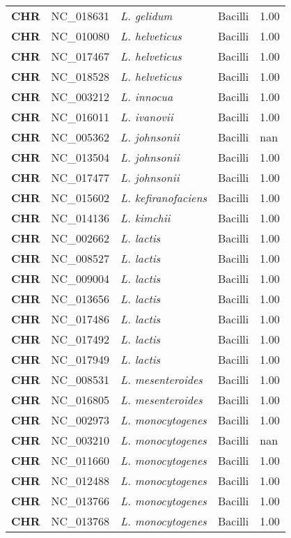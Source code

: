 \begin{adjustwidth}{-3cm}{2cm}
{\begin{supertabular}{>{\bfseries}l|p{0.1\textwidth}p{0.14\textwidth}l|l}
CHR & NC\_018631 & \textit{L. gelidum} & Bacilli & 1.00\\
CHR & NC\_010080 & \textit{L. helveticus} & Bacilli & 1.00\\
CHR & NC\_017467 & \textit{L. helveticus} & Bacilli & 1.00\\
CHR & NC\_018528 & \textit{L. helveticus} & Bacilli & 1.00\\
CHR & NC\_003212 & \textit{L. innocua} & Bacilli & 1.00\\
CHR & NC\_016011 & \textit{L. ivanovii} & Bacilli & 1.00\\
CHR & NC\_005362 & \textit{L. johnsonii} & Bacilli & nan\\
CHR & NC\_013504 & \textit{L. johnsonii} & Bacilli & 1.00\\
CHR & NC\_017477 & \textit{L. johnsonii} & Bacilli & 1.00\\
CHR & NC\_015602 & \textit{L. kefiranofaciens} & Bacilli & 1.00\\
CHR & NC\_014136 & \textit{L. kimchii} & Bacilli & 1.00\\
CHR & NC\_002662 & \textit{L. lactis} & Bacilli & 1.00\\
CHR & NC\_008527 & \textit{L. lactis} & Bacilli & 1.00\\
CHR & NC\_009004 & \textit{L. lactis} & Bacilli & 1.00\\
CHR & NC\_013656 & \textit{L. lactis} & Bacilli & 1.00\\
CHR & NC\_017486 & \textit{L. lactis} & Bacilli & 1.00\\
CHR & NC\_017492 & \textit{L. lactis} & Bacilli & 1.00\\
CHR & NC\_017949 & \textit{L. lactis} & Bacilli & 1.00\\
CHR & NC\_008531 & \textit{L. mesenteroides} & Bacilli & 1.00\\
CHR & NC\_016805 & \textit{L. mesenteroides} & Bacilli & 1.00\\
CHR & NC\_002973 & \textit{L. monocytogenes} & Bacilli & 1.00\\
CHR & NC\_003210 & \textit{L. monocytogenes} & Bacilli & nan\\
CHR & NC\_011660 & \textit{L. monocytogenes} & Bacilli & 1.00\\
CHR & NC\_012488 & \textit{L. monocytogenes} & Bacilli & 1.00\\
CHR & NC\_013766 & \textit{L. monocytogenes} & Bacilli & 1.00\\
CHR & NC\_013768 & \textit{L. monocytogenes} & Bacilli & 1.00\\

\end{supertabular}}
\end{adjustwidth}
